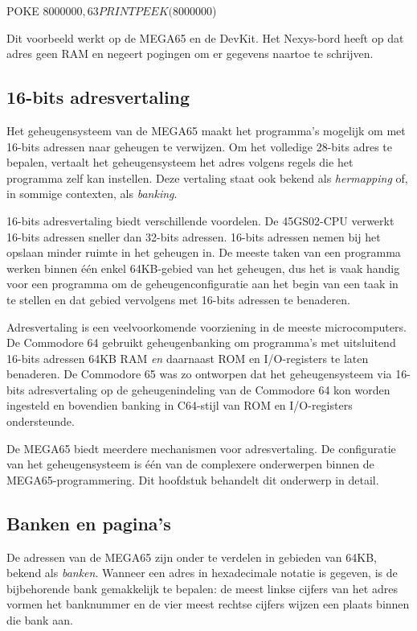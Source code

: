 \begin{basiccode}
POKE $8000000,63
PRINT PEEK($8000000)
\end{basiccode}

Dit voorbeeld werkt op de MEGA65 en de DevKit. Het Nexys-bord heeft op dat adres geen RAM en negeert pogingen om er gegevens naartoe te schrijven.

\subsection{16-bits adresvertaling}

Het geheugensysteem van de MEGA65 maakt het programma's mogelijk om met 16-bits adressen naar geheugen te verwijzen. Om het volledige 28-bits adres te bepalen, vertaalt het geheugensysteem het adres volgens regels die het programma zelf kan instellen. Deze vertaling staat ook bekend als {\em hermapping} of, in sommige contexten, als {\em banking}.

16-bits adresvertaling biedt verschillende voordelen. De 45GS02-CPU verwerkt 16-bits adressen sneller dan 32-bits adressen. 16-bits adressen nemen bij het opslaan minder ruimte in het geheugen in. De meeste taken van een programma werken binnen één enkel 64KB-gebied van het geheugen, dus het is vaak handig voor een programma om de geheugenconfiguratie aan het begin van een taak in te stellen en dat gebied vervolgens met 16-bits adressen te benaderen.

Adresvertaling is een veelvoorkomende voorziening in de meeste microcomputers. De Commodore 64 gebruikt geheugenbanking om programma's met uitsluitend 16-bits adressen 64KB RAM {\em en} daarnaast ROM en I/O-registers te laten benaderen. De Commodore 65 was zo ontworpen dat het geheugensysteem via 16-bits adresvertaling op de geheugenindeling van de Commodore 64 kon worden ingesteld en bovendien banking in C64-stijl van ROM en I/O-registers ondersteunde.

De MEGA65 biedt meerdere mechanismen voor adresvertaling. De configuratie van het geheugensysteem is één van de complexere onderwerpen binnen de MEGA65-programmering. Dit hoofdstuk behandelt dit onderwerp in detail.

\subsection{Banken en pagina's}

De adressen van de MEGA65 zijn onder te verdelen in gebieden van 64KB, bekend als {\em banken}. Wanneer een adres in hexadecimale notatie is gegeven, is de bijbehorende bank gemakkelijk te bepalen: de meest linkse cijfers van het adres vormen het banknummer en de vier meest rechtse cijfers wijzen een plaats binnen die bank aan.

